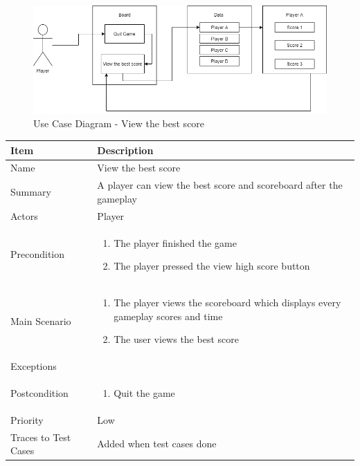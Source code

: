\documentclass[12pt]{article}
\begin{document}
\begin{figure}[htbp]
    \centering
    \includegraphics[scale=0.6]{images/ViewTheBestScore.png}
    \caption{Use Case Diagram - View the best score}
    \label{fig:ViewTheBestScore}
\end{figure}

\begin{center}
\setlength{\tabcolsep}{18pt}
\renewcommand{\arraystretch}{1.3}
\begin{tabular}{ |p{3cm}|p{10cm}| }
    \hline
    \rowcolor{green}
   Item & Description \\
    \hline
    Name & View the best score \\
    \hline
    Summary & A player can view the best score and scoreboard after the gameplay \\
    \hline
    Actors & Player \\
    \hline
    Precondition & 
    \vspace*{-0.2in}
    \begin{enumerate}
        \item The player finished the game
        \item The player pressed the view high score button
    \end{enumerate}  \\
    \hline
    Main Scenario &     
    \vspace*{-0.2in}
    \begin{enumerate}
        \item The player views the scoreboard which displays every gameplay scores and time
        \item The user views the best score
    \end{enumerate}  \\
    \hline
    Exceptions & \\
    \hline
    Postcondition &
    \vspace*{-0.2in}
    \begin{enumerate}
        \item Quit the game
    \end{enumerate}  \\
    \hline
    Priority & Low \\
    \hline
    Traces to Test Cases & Added when test cases done  \\
    \hline
\end{tabular}
\end{center}
\end{document}
